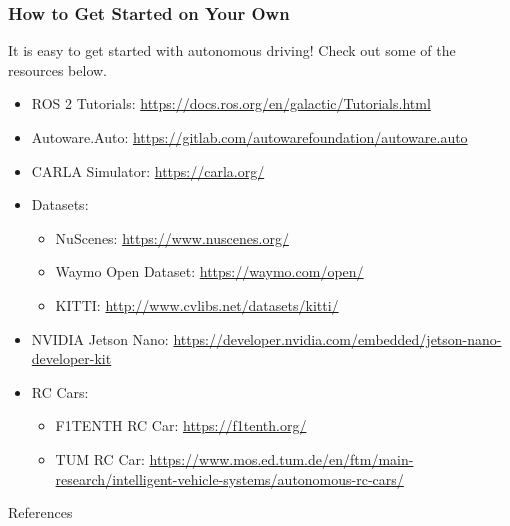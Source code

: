 \documentclass[aspectratio=169]{beamer}
\begin{document}
\begin{frame}
\frametitle{How to Get Started on Your Own}
It is easy to get started with autonomous driving! Check out some of the
resources below.
\footnotesize
\begin{itemize}
    \item ROS 2 Tutorials: \url{https://docs.ros.org/en/galactic/Tutorials.html}
    \item Autoware.Auto: \url{https://gitlab.com/autowarefoundation/autoware.auto}
    \item CARLA Simulator: \url{https://carla.org/}
    \item Datasets:
    \begin{itemize}
        \footnotesize
        \item NuScenes: \url{https://www.nuscenes.org/}
        \item Waymo Open Dataset: \url{https://waymo.com/open/}
        \item KITTI: \url{http://www.cvlibs.net/datasets/kitti/}
    \end{itemize}
    \item NVIDIA Jetson Nano: \url{https://developer.nvidia.com/embedded/jetson-nano-developer-kit}
    \item RC Cars:
    \begin{itemize}
        \footnotesize
        \item F1TENTH RC Car: \url{https://f1tenth.org/}
        \item TUM RC Car: \url{https://www.mos.ed.tum.de/en/ftm/main-research/intelligent-vehicle-systems/autonomous-rc-cars/}
    \end{itemize}
\end{itemize}
\end{frame}

\begin{frame}[allowframebreaks]{References}
\renewcommand*{\bibfont}{\normalfont\scriptsize}
\printbibliography
\end{frame}
\end{document}
